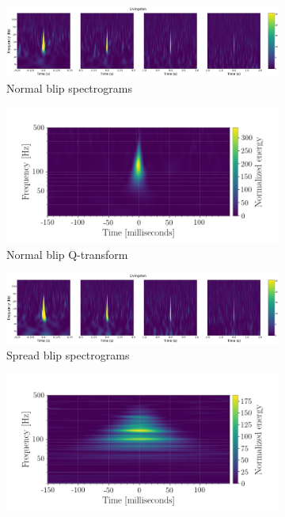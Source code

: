 \documentclass[a4paper]{article}
\begin{document}
\begin{figure}[h!]
	\centering
	\begin{subfigure}[t]{.7\textwidth}
		\centering
		\includegraphics[width=.9\linewidth]{normal_blip_spect}
		\caption{Normal blip spectrograms}
		\label{fig:normal_s}
	\end{subfigure}
	\begin{subfigure}[t]{.29\textwidth}
		\centering
		\includegraphics[width=1.1\linewidth]{normal_blip2}
		\caption{Normal blip Q-transform}
		\label{fig:normal_q}
	\end{subfigure}
	\begin{subfigure}[t]{.7\textwidth}
		\centering
		\includegraphics[width=.9\linewidth]{spread_blip_spect}
		\caption{Spread blip spectrograms}
		\label{fig:spread_s}
	\end{subfigure}
	\begin{subfigure}[t]{.29\textwidth}
		\centering
		\includegraphics[width=1.1\linewidth]{spread_blip2}

\end{subfigure}
\end{figure}
\end{document}
